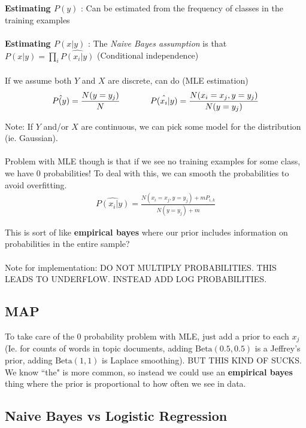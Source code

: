 \documentclass[a4paper]{article}\usepackage[]{graphicx}\usepackage[]{color}
\begin{document}
\textbf{Estimating $P(y)$} : Can be estimated from the frequency of classes in the training examples\\
\\
\textbf{Estimating $P(x|y)$} : The \emph{Naive Bayes assumption} is that $P(x|y) = \prod_i \hat{P(x_i|y)}$ (Conditional independence) \\
\\

If we assume both $Y$ and $X$ are discrete, can do (MLE estimation)
\begin{align*}
\hat{P(y)} = \frac{N(y=y_j)}{N} \hspace{0.5in} \hat{P(x_i|y)} = \frac{N(x_i=x_j,y=y_j)}{N(y=y_j)}
\end{align*}

Note: If $Y$ and/or $X$ are continuous, we can pick some model for the distribution (ie. Gaussian). \\
\\

Problem with MLE though is that if we see no training examples for some class, we have 0 probabilities! To deal with this, we can smooth the probabilities to avoid overfitting. 
\begin{align*}
\hat{P(x_i|y)} = \frac{N(x_i=x_j,y=y_j)+mP_{i,k}}{N(y=y_j)+m}
\end{align*}

This is sort of like \textbf{empirical bayes} where our prior includes information on probabilities in the entire sample?  \\
\\
Note for implementation: DO NOT MULTIPLY PROBABILITIES. THIS LEADS TO UNDERFLOW. INSTEAD ADD LOG PROBABILITIES.


\subsection{MAP}

To take care of the 0 probability problem with MLE, just add a prior to each $x_j$ (Ie. for counts of words in topic documents, adding $\text{Beta}(0.5,0.5)$ is a Jeffrey's prior, adding $\text{Beta}(1,1)$ is Laplace smoothing). BUT THIS KIND OF SUCKS. We know ``the" is more common, so instead we could use an \textbf{empirical bayes} thing where the prior is proportional to how often we see in data. 


\subsection{Naive Bayes vs Logistic Regression}
\end{document}
